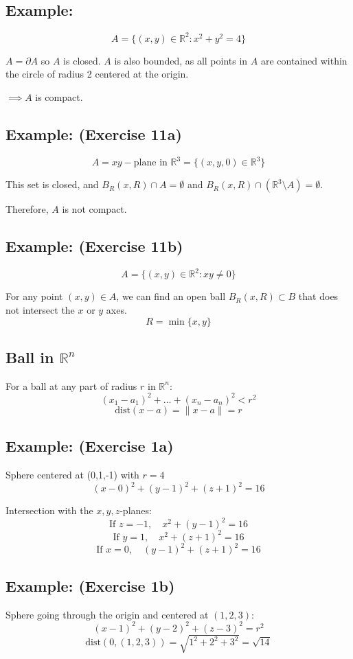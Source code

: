 \documentclass[11pt]{article}
\begin{document}
\subsection*{Example:}
\[
A = \{(x,y) \in \mathbb{R}^2 : x^2 + y^2 = 4\}
\]

$A = \partial A$ so $A$ is closed. $A$ is also bounded, as all points in $A$ are contained within the circle of radius 2 centered at the origin.

$\implies A$ is compact.

\subsection*{Example: (Exercise 11a)}
\[
A = xy-\text{plane in } \mathbb{R}^3 = \{(x,y,0) \in \mathbb{R}^3\}
\]

This set is closed, and $B_R(x, R) \cap A = \emptyset$ and $B_R(x, R) \cap (\mathbb{R}^3 \setminus A) = \emptyset$.

Therefore, $A$ is not compact.

\subsection*{Example: (Exercise 11b)}
\[
A = \{(x,y) \in \mathbb{R}^2 : xy \ne 0\}
\]

For any point $(x,y) \in A$, we can find an open ball $B_R(x, R) \subset B$ that does not intersect the $x$ or $y$ axes.
\[
R = \min\{x, y\}
\]

\subsection{Ball in $\mathbb{R}^n$}
For a ball at any part of radius $r$ in $\mathbb{R}^n$:
\[
(x_1 - a_1)^2 + \dots + (x_n - a_n)^2 < r^2
\]
\[
\text{dist}(x - a) = \|x - a\| = r
\]

\subsection*{Example: (Exercise 1a)}
Sphere centered at (0,1,-1) with $r = 4$
\[
(x-0)^2 + (y-1)^2 + (z+1)^2 = 16
\]

Intersection with the $x,y,z$-planes:
\[
\text{If } z = -1, \quad x^2 + (y-1)^2 = 16
\]
\[
\text{If } y = 1, \quad x^2 + (z+1)^2 = 16
\]
\[
\text{If } x = 0, \quad (y-1)^2 + (z+1)^2 = 16
\]

\subsection*{Example: (Exercise 1b)}
Sphere going through the origin and centered at $(1,2,3)$:
\[
(x-1)^2 + (y-2)^2 + (z-3)^2 = r^2
\]
\[
\text{dist}(0, (1,2,3)) = \sqrt{1^2 + 2^2 + 3^2} = \sqrt{14}
\]
\end{document}
